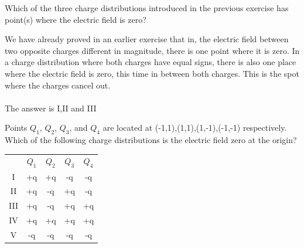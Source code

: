 
\begin{question}
Which of the three charge distributions introduced in the previous exercise has point(s) where the electric field is zero?
\end{question}

\begin{solution}
We have already proved in an earlier exercise that in, the electric field between two opposite charges different in magnitude, there is one point where it is zero. In a charge distribution where both charges have equal signs, there is also one place where the electric field is zero, this time in between both charges. This is the spot where the charges cancel out.
\\\\
The answer is I,II and III
\end{solution}


\begin{question}
Points $Q_1$, $Q_2$, $Q_3$, and $Q_4$ are located at (-1,1),(1,1),(1,-1),(-1,-1) respectively. Which of the following charge distributions is the electric field zero at the origin?

\begin{center}
\begin{tabular}{ |c|c|c|c|c| } 
 \hline
       & $Q_1$ & $Q_2$ & $Q_3$ & $Q_4$ \\ 
 I        & +q  & +q & -q & -q  \\ 
 II       & +q  & -q & +q & -q  \\ 
 III      & +q  & -q & +q & +q  \\ 
 IV       & +q  & +q & +q & +q  \\ 
 V        & -q  & -q & -q & -q  \\ 
 \hline
\end{tabular}
\end{center}

\end{question}

